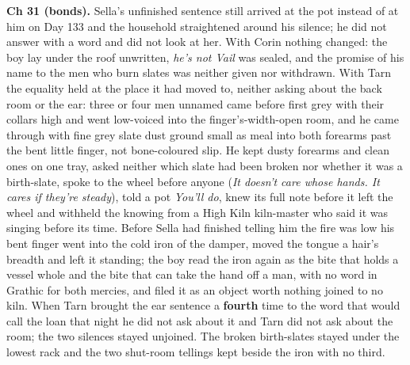 \documentclass{design/chronicle}
\begin{document}
{\textbf{Ch 31 (bonds).} Sella’s unfinished sentence still arrived at the pot instead of at him on Day 133 and the household straightened around his silence; he did not answer with a word and did not look at her. With Corin nothing changed: the boy lay under the roof unwritten, \emph{he’s not Vail} was sealed, and the promise of his name to the men who burn slates was neither given nor withdrawn. With Tarn the equality held at the place it had moved to, neither asking about the back room or the ear: three or four men unnamed came before first grey with their collars high and went low-voiced into the finger’s-width-open room, and he came through with fine grey slate dust ground small as meal into both forearms past the bent little finger, not bone-coloured slip. He kept dusty forearms and clean ones on one tray, asked neither which slate had been broken nor whether it was a birth-slate, spoke to the wheel before anyone (\emph{It doesn’t care whose hands. It cares if they’re steady}), told a pot \emph{You’ll do}, knew its full note before it left the wheel and withheld the knowing from a High Kiln kiln-master who said it was singing before its time. Before Sella had finished telling him the fire was low his bent finger went into the cold iron of the damper, moved the tongue a hair’s breadth and left it standing; the boy read the iron again as the bite that holds a vessel whole and the bite that can take the hand off a man, with no word in Grathic for both mercies, and filed it as an object worth nothing joined to no kiln. When Tarn brought the ear sentence a \textbf{fourth} time to the word that would call the loan that night he did not ask about it and Tarn did not ask about the room; the two silences stayed unjoined. The broken birth-slates stayed under the lowest rack and the two shut-room tellings kept beside the iron with no third.

}
\end{document}
